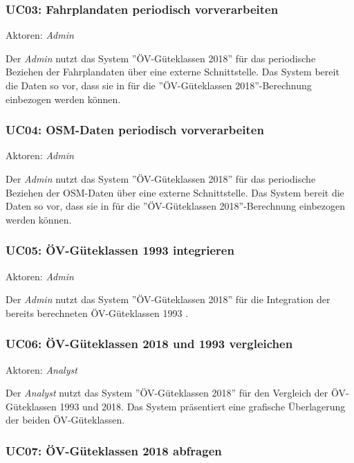 \subsubsection{UC03: Fahrplandaten periodisch vorverarbeiten}
\label{Use Cases:UC03}

Aktoren: \emph{Admin}

Der \emph{Admin} nutzt das System ''\acs{ÖV}-Güteklassen 2018'' für das periodische Beziehen der Fahrplandaten über eine externe Schnittstelle.
Das System bereit die Daten so vor, dass sie in  für die ''\acs{ÖV}-Güteklassen 2018''-Berechnung einbezogen werden können.

\subsubsection{UC04: OSM-Daten periodisch vorverarbeiten}
\label{Use Cases:UC04}

Aktoren: \emph{Admin}

Der \emph{Admin} nutzt das System ''\acs{ÖV}-Güteklassen 2018'' für das periodische Beziehen der \acs{OSM}-Daten über eine externe Schnittstelle.
Das System bereit die Daten so vor, dass sie in  für die ''\acs{ÖV}-Güteklassen 2018''-Berechnung einbezogen werden können.


\subsubsection{UC05: ÖV-Güteklassen 1993 integrieren}
\label{Use Cases:UC05}

Aktoren: \emph{Admin}

Der \emph{Admin} nutzt das System ''\acs{ÖV}-Güteklassen 2018'' für die Integration der bereits berechneten ÖV-Güteklassen 1993 \cite{berechnung_are}.


\subsubsection{UC06: ÖV-Güteklassen 2018 und 1993 vergleichen}
\label{Use Cases:UC06}

Aktoren: \emph{Analyst}

Der \emph{Analyst} nutzt das System ''\acs{ÖV}-Güteklassen 2018'' für den Vergleich der \acs{ÖV}-Güteklassen 1993 und 2018.
Das System präsentiert eine grafische Überlagerung der beiden \acs{ÖV}-Güteklassen.

\subsubsection{UC07: ÖV-Güteklassen 2018 abfragen}
\label{Use Cases:UC07}

